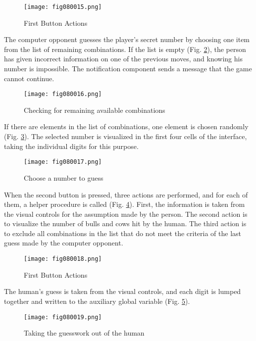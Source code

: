 \begin{figure}[H]
   \centering
   \texttt{[image: fig080015.png]}
   \caption{First Button Actions}
\label{fig080015}
\end{figure}

The computer opponent guesses the player's secret number by choosing one item from the list of remaining combinations. If the list is empty (Fig. \ref{fig080016}), the person has given incorrect information on one of the previous moves, and knowing his number is impossible. The notification component sends a message that the game cannot continue.

\begin{figure}[H]
   \centering
   \texttt{[image: fig080016.png]}
   \caption{Checking for remaining available combinations}
\label{fig080016}
\end{figure}

If there are elements in the list of combinations, one element is chosen randomly (Fig. \ref{fig080017}). The selected number is visualized in the first four cells of the interface, taking the individual digits for this purpose.

\begin{figure}[H]
   \centering
   \texttt{[image: fig080017.png]}
   \caption{Choose a number to guess}
\label{fig080017}
\end{figure}

When the second button is pressed, three actions are performed, and for each of them, a helper procedure is called (Fig. \ref{fig080018}). First, the information is taken from the visual controls for the assumption made by the person. The second action is to visualize the number of bulls and cows hit by the human. The third action is to exclude all combinations in the list that do not meet the criteria of the last guess made by the computer opponent.

\begin{figure}[H]
   \centering
   \texttt{[image: fig080018.png]}
   \caption{First Button Actions}
\label{fig080018}
\end{figure}

The human's guess is taken from the visual controls, and each digit is lumped together and written to the auxiliary global variable (Fig. \ref{fig080019}).

\begin{figure}[H]
   \centering
   \texttt{[image: fig080019.png]}
   \caption{Taking the guesswork out of the human}
\label{fig080019}
\end{figure}

